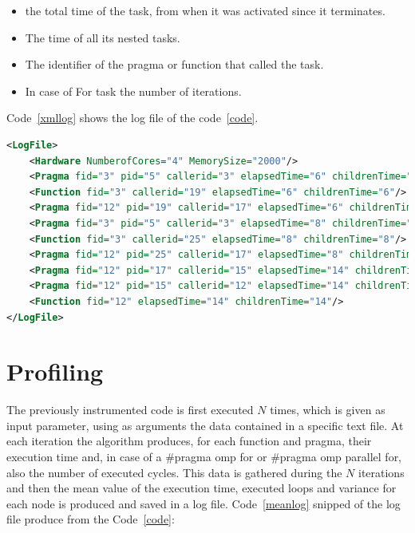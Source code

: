 \documentclass[a4paper,12pt,oneside]{book}
\begin{document}
\begin{itemize}
\item the total time of the task, from when it was activated since it terminates.
\item The time of all its nested tasks.
\item The identifier of the pragma or function that called the task.
\item In case of For task the number of iterations.
\end{itemize}

Code~\ref{xmllog} shows the log file of the code~\ref{code}.

\begin{lstlisting}[language=XML, caption=XML file of the pragma structure of Code~\ref{code}., label=xmllog]
<LogFile>
	<Hardware NumberofCores="4" MemorySize="2000"/>
	<Pragma fid="3" pid="5" callerid="3" elapsedTime="6" childrenTime="0" loops="6"/>
	<Function fid="3" callerid="19" elapsedTime="6" childrenTime="6"/>
	<Pragma fid="12" pid="19" callerid="17" elapsedTime="6" childrenTime="6"/>
	<Pragma fid="3" pid="5" callerid="3" elapsedTime="8" childrenTime="0" loops="8"/>
	<Function fid="3" callerid="25" elapsedTime="8" childrenTime="8"/>
	<Pragma fid="12" pid="25" callerid="17" elapsedTime="8" childrenTime="8"/>
	<Pragma fid="12" pid="17" callerid="15" elapsedTime="14" childrenTime="14"/>
	<Pragma fid="12" pid="15" callerid="12" elapsedTime="14" childrenTime="14"/>
	<Function fid="12" elapsedTime="14" childrenTime="14"/>
</LogFile>
\end{lstlisting}


\section{Profiling}

The previously instrumented code is first executed $N$ times, which is given as input parameter, using as arguments the data contained in a specific text file. At each iteration the algorithm produces, for each function and pragma, their execution time and, in case of a $\#$pragma omp for or $\#$pragma omp parallel for, also the number of executed cycles. This data is gathered during the $N$ iterations and then the mean value of the execution time, executed loops and variance for each node is produced and saved in a log file. 
Code~\ref{meanlog} snipped of the log file produce from the Code~\ref{code}:
\end{document}
